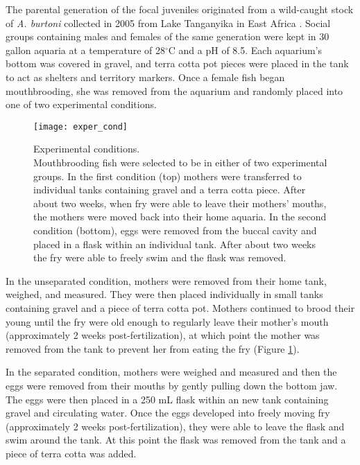 \documentclass[12pt,twoside]{reedthesis}
\begin{document}
The parental generation of the focal juveniles originated from a wild-caught
stock of \textit{A. burtoni} collected in 2005 from Lake Tanganyika in East
Africa \citep{renn_maternal_2009}.
Social groups containing males and females of the same generation were kept in
30 gallon aquaria at a temperature of 28$^\circ$C and a pH of 8.5. Each aquarium's bottom
was covered in gravel, and terra cotta pot pieces were placed in the tank to act
as shelters and territory markers. Once a female fish began mouthbrooding, she
was removed from the aquarium and randomly placed into one of two experimental
conditions.

\begin{figure}[htbp] 
\begin{centering} 
\texttt{[image: exper\_cond]}
\caption[Experimental conditions]{\footnotesize{Experimental conditions.\\
    Mouthbrooding fish were selected to be in either of two experimental groups.
  In the first condition (top) mothers were transferred to individual tanks
  containing gravel and a terra cotta piece. After about two weeks, when fry were
able to leave their mothers' mouths, the mothers were moved back into their home
aquaria. In the second condition (bottom), eggs were removed from the buccal
cavity and placed in a flask within an individual tank. After about two weeks
the fry were able to freely swim and the flask was removed.}} 
\label{conditions}
\end{centering} 
\end{figure}

In the unseparated condition, mothers were removed from their home tank,
weighed, and measured. They were then placed individually in small tanks containing gravel
and a piece of terra cotta pot. Mothers continued to brood their young until the
fry were old enough to regularly leave their mother's mouth (approximately 2
weeks post-fertilization), at which point the mother was removed from the tank
to prevent her from eating the fry (Figure \ref{conditions}). 

In the separated condition, mothers were weighed and measured and then the eggs
were removed from their mouths by gently pulling down the bottom
jaw. The eggs were then placed in a 250 mL flask within an new tank containing
gravel and circulating water. Once
the eggs developed into freely moving fry (approximately 2 weeks
post-fertilization), they were able to leave the flask and swim around the tank.
At this point the flask was removed from the tank and a piece of terra cotta was added.
\end{document}
